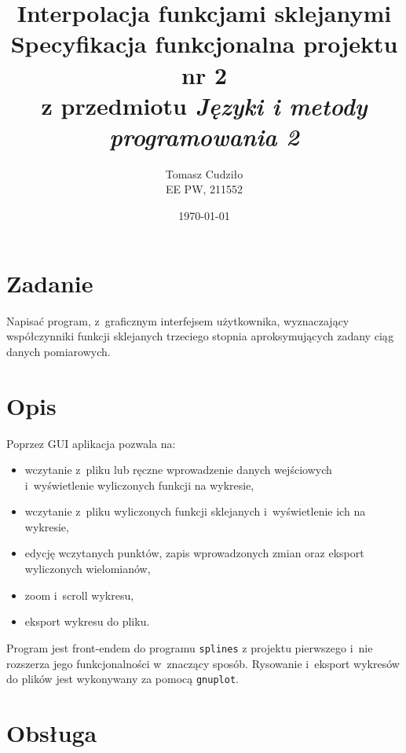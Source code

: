 \documentclass[10pt,a4paper]{article}
\newcommand{\prog}[1]{\texttt{#1}}
\begin{document}
\title{ 
  Interpolacja funkcjami sklejanymi\\
  {\normalsize Specyfikacja funkcjonalna projektu nr 2}\\\vspace{-12pt}
  {\normalsize z przedmiotu \emph{Języki i metody programowania 2}}
}
\author{
  Tomasz Cudziło\\
  {\small EE PW, 211552}
}
\date{\today}
\maketitle

\section*{Zadanie}
\label{sec:zadanie}

Napisać program, z~graficznym interfejsem użytkownika, wyznaczający
współczynniki funkcji sklejanych trzeciego stopnia aproksymujących zadany ciąg
danych pomiarowych.

\vspace{24pt}

\section{Opis}
\label{sec:opis}

Poprzez GUI aplikacja pozwala na:
\begin{itemize}
  \item wczytanie z~pliku lub ręczne wprowadzenie danych wejściowych
    i~wyświetlenie wyliczonych funkcji na wykresie,
  \item wczytanie z~pliku wyliczonych funkcji sklejanych i~wyświetlenie ich na
    wykresie,
  \item edycję wczytanych punktów, zapis wprowadzonych zmian oraz eksport
    wyliczonych wielomianów,
  \item zoom i~scroll wykresu,
  \item eksport wykresu do pliku.
\end{itemize}

Program jest front-endem do programu \prog{splines} z projektu pierwszego i~nie
rozszerza jego funkcjonalności w~znaczący sposób. Rysowanie i~eksport wykresów
do plików jest wykonywany za pomocą \prog{gnuplot}.

\section{Obsługa}
\label{sec:obsluga}
\end{document}
